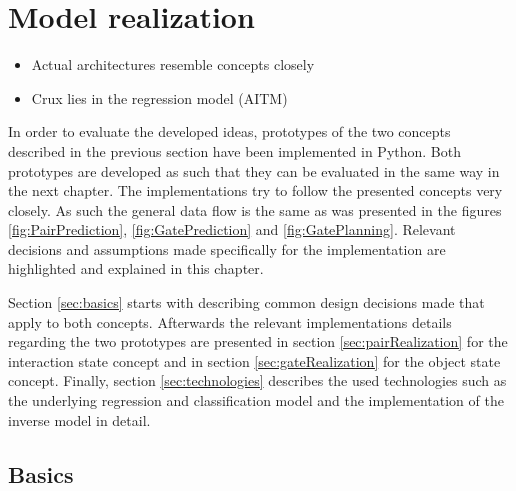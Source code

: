 \chapter{Model realization\label{chap:modelReal}}



\begin{itemize}
	\item Actual architectures resemble concepts closely
	\item Crux lies in the regression model (AITM)
\end{itemize}

In order to evaluate the developed ideas, prototypes of the two concepts described in the previous section have been implemented in Python. Both prototypes are developed as such that they can be evaluated in the same way in the next chapter. The implementations try to follow the presented concepts very closely. As such the general data flow is the same as was presented in the figures  \ref{fig:PairPrediction}, \ref{fig:GatePrediction} and \ref{fig:GatePlanning}.
Relevant decisions and assumptions made specifically for the implementation are highlighted and explained in this chapter. %

Section \ref{sec:basics} starts with describing common design decisions made that apply to both concepts. Afterwards the relevant implementations details regarding the two prototypes are presented in section \ref{sec:pairRealization} for the interaction state concept and in section \ref{sec:gateRealization} for the object state concept. Finally, section \ref{sec:technologies} describes the used technologies such as the underlying regression and classification model and the implementation of the inverse model in detail.

\section{Basics \label{sec:basics}}


